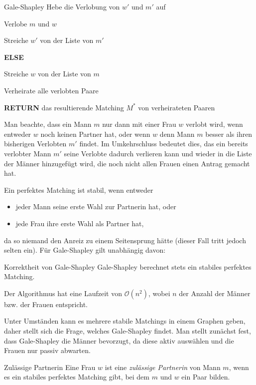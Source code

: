 \documentclass{panikzettel}
\newcommand\tab[1][1cm]{\hspace*{#1}}
\begin{document}
{\begin{algo}{Gale-Shapley}
	\tab\tab\tab Hebe die Verlobung von $w'$ und $m'$ auf
	
	\tab\tab\tab Verlobe $m$ und $w$
	
	\tab\tab\tab Streiche $w'$ von der Liste von $m'$
	
	\tab\tab \textbf{ELSE}
	
	\tab\tab\tab Streiche $w$ von der Liste von $m$
	
	Verheirate alle verlobten Paare
	
	\textbf{RETURN} das resultierende Matching $M^*$ von verheirateten Paaren
\end{algo}

Man beachte, dass ein Mann $m$ nur dann mit einer Frau $w$ verlobt wird, wenn entweder $w$ noch keinen Partner hat, oder wenn $w$ denn Mann $m$ besser als ihren bisherigen Verlobten $m'$ findet. Im Umkehrschluss bedeutet dies, das ein bereits verlobter Mann $m'$ seine Verlobte dadurch verlieren kann und wieder in die Liste der Männer hinzugefügt wird, die noch nicht allen Frauen einen Antrag gemacht hat. 

Ein perfektes Matching ist stabil, wenn entweder 
\begin{itemize}
	\item jeder Mann seine erste Wahl zur Partnerin hat, oder
	\item jede Frau ihre erste Wahl als Partner hat,
\end{itemize}
da so niemand den Anreiz zu einem Seitensprung hätte (dieser Fall tritt jedoch selten ein). Für Gale-Shapley gilt unabhängig davon:

\begin{theo}{Korrektheit von Gale-Shapley}
	Gale-Shapley berechnet stets ein stabiles perfektes Matching. 
	
	Der Algorithmus hat eine Laufzeit von $\mathcal{O}(n^2)$, wobei $n$ der Anzahl der Männer bzw. der Frauen entspricht.
\end{theo}

Unter Umständen kann es mehrere stabile Matchings in einem Graphen geben, daher stellt sich die Frage, welches Gale-Shapley findet. Man stellt zunächst fest, dass Gale-Shapley die Männer bevorzugt, da diese aktiv auswählen und die Frauen nur passiv abwarten. 

\begin{thirdboxl}
	\vspace{-\baselineskip}	
	\begin{defi}{Zulässige Partnerin}
		Eine Frau $w$ ist eine \emph{zulässige Partnerin} von Mann $m$, wenn es ein stabiles perfektes Matching gibt, bei dem $m$ und $w$ ein Paar bilden.
	\end{defi}


\end{thirdboxl}}
\end{document}
